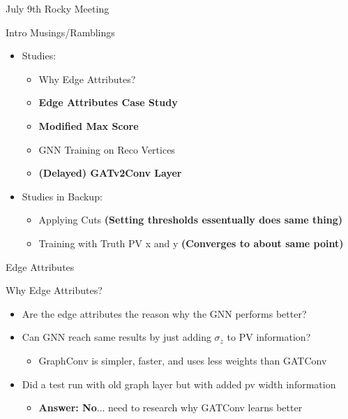 \documentclass[xcolor=table,aspectratio=169]{beamer}
\begin{document}
\begin{frame}[plain]
    \centering
    July 9th Rocky Meeting
\end{frame}

\begin{frame}{Intro Musings/Ramblings}
    \centering
    \begin{itemize}
        \item Studies:
        \begin{itemize}
            \item Why Edge Attributes?
            \item \textbf{Edge Attributes Case Study}
            \item \textbf{Modified Max Score}
            \item GNN Training on Reco Vertices
            \item \textbf{(Delayed) GATv2Conv Layer}
        \end{itemize}
        \item Studies in Backup:
        \begin{itemize}
            \item Applying Cuts \textbf{(Setting thresholds essentually does same thing)}
            \item Training with Truth PV x and y \textbf{(Converges to about same point)}
        \end{itemize}
    \end{itemize}
\end{frame}

\begin{frame}[plain]
    \centering
    Edge Attributes
\end{frame}

\begin{frame}{Why Edge Attributes?}
    \begin{itemize}
        \item Are the edge attributes the reason why the GNN performs better?
        \item Can GNN reach same results by just adding \(\sigma_z\) to PV information?
        \begin{itemize}
            \item GraphConv is simpler, faster, and uses less weights than GATConv
        \end{itemize}
        \item Did a test run with old graph layer but with added pv width information
        \begin{itemize}
            \item \textbf{Answer: No}... need to research why GATConv learns better
        \end{itemize}
    \end{itemize}
\end{frame}
\end{document}
